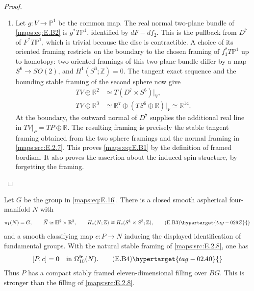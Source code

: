 \begin{proof}
\begin{enumerate}[label={$\langle1\rangle$\arabic*.},leftmargin=*]
\item Let $g:V\to\mathbb P^1$ be the common map. The real normal
two-plane bundle of \eqref{maps:eq:E.B2} is $g^*T\mathbb P^1$, identified by
$dF-df_2$. This is the pullback from $D^7$ of $F^*T\mathbb P^1$,
which is trivial because the disc is contractible. A choice of
its oriented framing restricts on the boundary to the chosen
framing of $f_1^*T\mathbb P^1$ up to homotopy: two oriented
framings of this two-plane bundle differ by a map
$S^6\to SO(2)$, and $H^1(S^6;\mathbb Z)=0$.
The tangent exact sequence and the bounding stable framing of
the second sphere now give
\[
 \begin{split}
 TV\oplus\mathbb R^2&\simeq
       T(D^7\times S^6)|_V,\\
 TV\oplus\mathbb R^3&\simeq
       \mathbb R^7\oplus(TS^6\oplus\mathbb R)|_V
       \simeq\mathbb R^{14}.
 \end{split}
\]
At the boundary, the outward normal of $D^7$ supplies the
additional real line in $TV|_P=TP\oplus\mathbb R$.
The resulting framing is precisely the stable tangent framing
obtained from the two sphere framings and the normal framing
in \ref{maps:src:E.2.7}. This proves \eqref{maps:eq:E.B1} by the definition of framed bordism.
It also proves the assertion about the induced spin structure,
by forgetting the framing.

\end{enumerate}
\end{proof}


\begin{theorem}\hypertarget{tag-02MT}{}\label{maps:src:E.2.9}


Let $G$ be the group in \eqref{maps:eq:E.16}. There is a closed smooth
aspherical four-manifold $N$ with
\[
 \pi_1(N)=G,\qquad \widetilde N\simeq\mathbb H^2\times\mathbb R^2,
 \qquad H_*(N;\mathbb Z)\cong H_*(S^1\times S^3;\mathbb Z),
 \tag{E.B3}\hypertarget{tag-029Z}{}\label{maps:eq:E.B3}
\]
and a smooth classifying map $c:P\to N$ inducing the displayed
identification of fundamental groups. With the natural stable
framing of \ref{maps:src:E.2.8}, one has
\[
                 [P,c]=0\quad\hbox{in }\Omega^{\mathrm{fr}}_{10}(N).
 \tag{E.B4}\hypertarget{tag-02A0}{}\label{maps:eq:E.B4}
\]
Thus $P$ has a compact stably framed eleven-dimensional filling
over $BG$. This is stronger than the filling of \ref{maps:src:E.2.8}.
\end{theorem}


